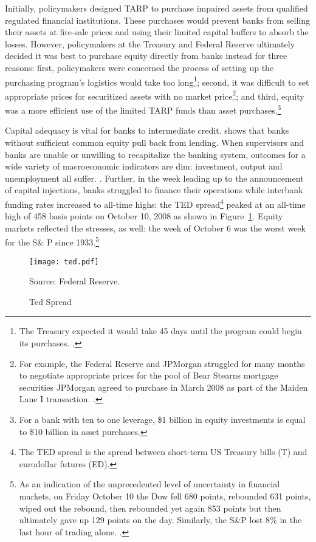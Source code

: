 \documentclass[12pt]{article}
\begin{document}
Initially, policymakers designed TARP to purchase impaired assets from qualified regulated financial institutions. These purchases would prevent banks from selling their assets at fire-sale prices and using their limited capital buffers to absorb the losses. However, policymakers at the Treasury and Federal Reserve ultimately decided it was best to purchase equity directly from banks instead for three reasons: first, policymakers were concerned the process of setting up the purchasing program's logistics would take too long\footnote{The Treasury expected it would take 45 days until the program could begin its purchases. \citep{Geithner}.}; second, it was difficult to set appropriate prices for securitized assets with no market price\footnote{For example, the Federal Reserve and JPMorgan struggled for many months to negotiate appropriate prices for the pool of Bear Stearns mortgage securities JPMorgan agreed to purchase in March 2008 as part of the Maiden Lane I transaction. \citep{Geithner}.}; and third, equity was a more efficient use of the limited TARP funds than asset purchases.\footnote{For a bank with ten to one leverage, \$1 billion in equity investments is equal to \$10 billion in asset purchases.}

Capital adequacy is vital for banks to intermediate credit. \citet{Peek} shows that banks without sufficient common equity pull back from lending. When supervisors and banks are unable or unwilling to recapitalize the banking system, outcomes for a wide variety of macroeconomic indicators are dim: investment, output and unemployment all suffer. \citep{Hoshi}. Further, in the week leading up to the announcement of capital injections, banks struggled to finance their operations while interbank funding rates increased to all-time highs: the TED spread\footnote{The TED spread is the spread between short-term US Treasury bills (T) and eurodollar futures (ED).} peaked at an all-time high of 458 basis points on October 10, 2008 as shown in Figure~\ref{ted}. Equity markets reflected the stresses, as well: the week of October 6 was the worst week for the S\& P since 1933.\footnote{As an indication of the unprecedented level of uncertainty in financial markets, on Friday October 10 the Dow fell 680 points, rebounded 631 points, wiped out the rebound, then rebounded yet again 853 points but then ultimately gave up 129 points on the day. Similarly, the S\&P lost 8\% in the last hour of trading alone. \citep{paulsonbook}.}

\begin{figure}[h]
\caption{Ted Spread}\label{ted}
\centering
\texttt{[image: ted.pdf]}
\raggedright
\footnotesize Source: Federal Reserve.
\end{figure}
\end{document}
